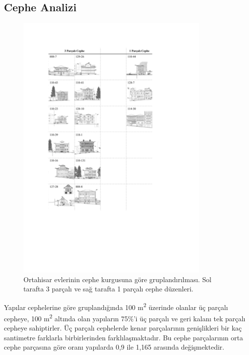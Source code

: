 \documentclass[12pt,turkish,a4paperpaper,]{report}
\begin{document}
\newpage

\hypertarget{cephe-analizi}{%
\subsection{Cephe Analizi}\label{cephe-analizi}}

\begin{figure}
\centering
\includegraphics[width=0.85\textwidth,height=\textheight]{source/figures/cephegruplandirma.pdf}
\caption{Ortahisar evlerinin cephe kurgusuna göre gruplandırılması. Sol
tarafta 3 parçalı ve sağ tarafta 1 parçalı cephe düzenleri.
\label{cephegruplama}}
\end{figure}

\newpage

Yapılar cephelerine göre gruplandığında 100 m\textsuperscript{2}
üzerinde olanlar üç parçalı cepheye, 100 m\textsuperscript{2} altında
olan yapıların 75\%'i üç parçalı ve geri kalanı tek parçalı cepheye
sahiptirler. Üç parçalı cephelerde kenar parçalarının genişlikleri bir
kaç santimetre farklarla birbirlerinden farklılaşmaktadır. Bu cephe
parçalarının orta cephe parçasına göre oranı yapılarda 0,9 ile 1,165
arasında değişmektedir.
\end{document}
